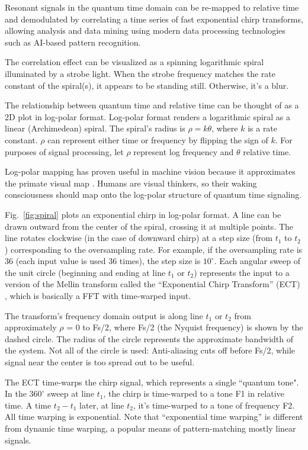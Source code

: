 Resonant signals in the quantum time domain can be re-mapped to relative time
and demodulated by correlating a time series of fast exponential chirp
transforms, allowing analysis and data mining using modern data
processing technologies such as AI-based pattern recognition.

The correlation effect can be visualized as a spinning logarithmic spiral
illuminated by a strobe light. When the strobe frequency matches the rate
constant of the spiral(s), it appears to be standing still.
Otherwise, it's a blur.

The relationship between quantum time and relative time can be thought of as a
2D plot in log-polar format.
Log-polar format renders a logarithmic spiral as a linear (Archimedean) spiral.
The spiral's radius is $\rho = k\theta$, where $k$ is a rate constant.
$\rho$ can represent either time or frequency by flipping the sign of $k$.
For purposes of signal processing, let $\rho$ represent log frequency and
$\theta$ relative time.

Log-polar mapping has proven useful in machine vision \cite{Bonmassar}
because it approximates the primate visual map \cite{Schwartz}.
Humans are visual thinkers, so their waking consciousness should map onto the
log-polar structure of quantum time signaling.

Fig.~\ref{fig:spiral} plots an exponential chirp in log-polar format.
A line can be drawn outward from the center of the spiral, crossing it at
multiple points.
The line rotates clockwise (in the case of downward chirp) at a step size
(from $t_1$ to $t_2$) corresponding to the oversampling rate.
For example, if the oversampling rate is 36 (each input value is used 36 times),
the step size is $10^{\circ}$.
Each angular sweep of the unit circle
(beginning and ending at line $t_1$ or $t_2$)
represents the input to a version of the Mellin transform called the
``Exponential Chirp Transform'' (ECT) \cite{Bonmassar}, which is
basically a FFT with time-warped input.

The transform's frequency domain output is along line $t_1$ or $t_2$ from
approximately $\rho$ = 0 to Fs/2, where Fs/2 (the Nyquist frequency)
is shown by the dashed circle.
The radius of the circle represents the approximate bandwidth of the system.
Not all of the circle is used: Anti-aliasing cuts off before Fs/2, while signal
near the center is too spread out to be useful.

The ECT time-warps the chirp signal, which represents a single ``quantum tone".
In the $360^{\circ}$ sweep at line $t_1$,
the chirp is time-warped to a tone F1 in relative time.
A time $t_2-t_1$ later, at line $t_2$,
it's time-warped to a tone of frequency F2.
All time warping is exponential.
Note that ``exponential time warping'' is different from dynamic time warping,
a popular means of pattern-matching mostly linear signals.

